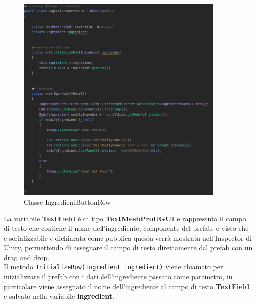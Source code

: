 \begin{figure}[H]
    \centering
    \includegraphics[width=0.9\textwidth,height=\textheight,keepaspectratio]{figures/chapter_1/prefab_CODICE.png}
    \caption{Classe IngredientButtonRow}
    \label{fig:prefabCodice}
\end{figure}

La variabile \textbf{TextField} è di tipo \textbf{TextMeshProUGUI} e rappresenta il campo di testo che contiene il nome dell'ingrediente, componente del prefab, e visto che è serializzabile e dichiarata come pubblica questa verrà mostrata nell'Inspector di Unity, permettendo di assegnare il campo di testo direttamente dal prefab con un drag and drop.\\
Il metodo \texttt{InitializeRow(Ingredient ingredient)} viene chiamato per inizializzare il prefab con i dati dell'ingrediente passato come parametro, in particolare viene assegnato il nome dell'ingrediente al campo di testo \textbf{TextField} e salvato nella variabile \textbf{ingredient}.
